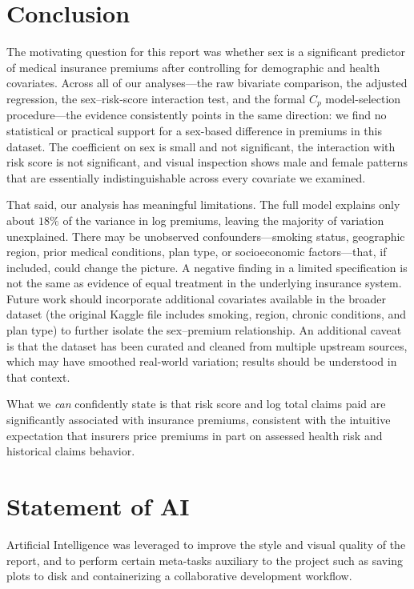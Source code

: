 \documentclass[12pt, a4paper]{article}
\begin{document}
\section{Conclusion}
 
The motivating question for this report was whether sex is a significant predictor of medical insurance premiums after controlling for demographic and health covariates. Across all of our analyses---the raw bivariate comparison, the adjusted regression, the sex--risk-score interaction test, and the formal $C_p$ model-selection procedure---the evidence consistently points in the same direction: we find no statistical or practical support for a sex-based difference in premiums in this dataset. The coefficient on sex is small and not significant, the interaction with risk score is not significant, and visual inspection shows male and female patterns that are essentially indistinguishable across every covariate we examined.
 
That said, our analysis has meaningful limitations. The full model explains only about $18\%$ of the variance in log premiums, leaving the majority of variation unexplained. There may be unobserved confounders---smoking status, geographic region, prior medical conditions, plan type, or socioeconomic factors---that, if included, could change the picture. A negative finding in a limited specification is not the same as evidence of equal treatment in the underlying insurance system. Future work should incorporate additional covariates available in the broader dataset (the original Kaggle file includes smoking, region, chronic conditions, and plan type) to further isolate the sex--premium relationship. An additional caveat is that the dataset has been curated and cleaned from multiple upstream sources, which may have smoothed real-world variation; results should be understood in that context.
 
What we \emph{can} confidently state is that risk score and log total claims paid are significantly associated with insurance premiums, consistent with the intuitive expectation that insurers price premiums in part on assessed health risk and historical claims behavior.
 
\section{Statement of AI}
 
Artificial Intelligence was leveraged to improve the style and visual quality of the report, and to perform certain meta-tasks auxiliary to the project such as saving plots to disk and containerizing a collaborative development workflow.
 
\end{document}
